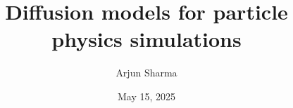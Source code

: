 



\title[Diffusion models for simulations]{Diffusion models for particle physics simulations}

\author[]{Arjun Sharma}

\vspace{-2cm}\date{May 15, 2025}

